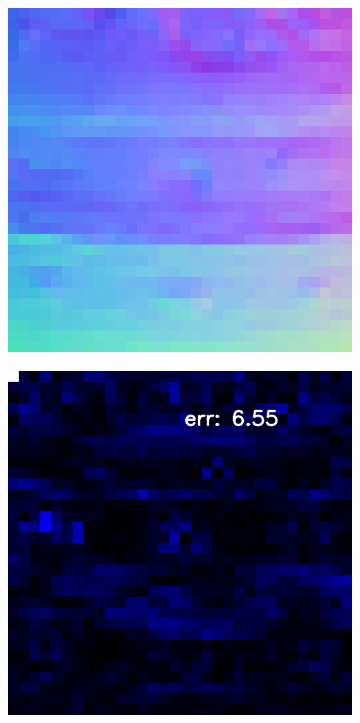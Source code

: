 \begin{figure}
\begin{subfigure}[b]{0.24\linewidth}
	\end{subfigure}
	\begin{subfigure}[b]{0.24\linewidth}
		\includegraphics[width=\linewidth]{./Figures/gcnn_synthetic/eval_2_normal_an2-8-1000.png}
	\end{subfigure}
	\begin{subfigure}[b]{0.24\linewidth}
		\includegraphics[width=\linewidth]{./Figures/gcnn_synthetic/eval_2_error_an2-8-1000.png}
	\end{subfigure}
	

\end{figure}
